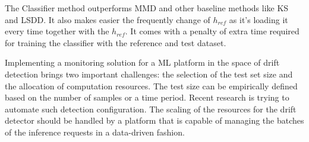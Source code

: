 \documentclass[12pt]{report}
\begin{document}


The Classifier method outperforms MMD and other baseline methods like KS and LSDD.
It also makes easier the frequently change of \(h_{ref}\) as it's loading it every time together with the \(h_{ref}\).
It comes with a penalty of extra time required for training the classifier with the reference and test dataset.

Implementing a monitoring solution for a ML platform in the space of drift detection brings two important challenges: the selection of the test set size and the allocation of computation resources.
The test size can be empirically defined based on the number of samples or a time period.
Recent research \cite{cobbSequentialMultivariateChange2021} \cite{kublerAutoMLTwoSampleTest2022} is trying to automate such detection configuration.
The scaling of the resources for the drift detector should be handled by a platform that is capable of managing the batches of the inference requests in a data-driven fashion.


%
%
\printbibliography
\end{document}
